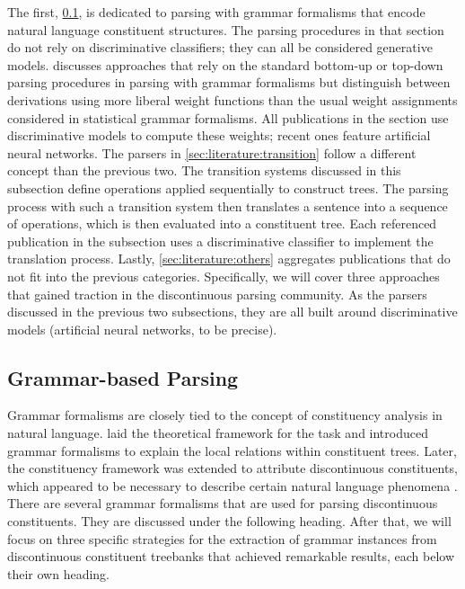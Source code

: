 \documentclass[../document.tex]{subfiles}
\begin{document}
    The first, \cref{sec:literature:grammar}, is dedicated to parsing with grammar formalisms that encode natural language constituent structures.
    The parsing procedures in that section do not rely on discriminative classifiers; they can all be considered generative models.
     discusses approaches that rely on the standard bottom-up or top-down parsing procedures in parsing with grammar formalisms but distinguish between derivations using more liberal weight functions than the usual weight assignments considered in statistical grammar formalisms.
    All publications in the section use discriminative models to compute these weights; recent ones feature artificial neural networks.
    The parsers in \cref{sec:literature:transition} follow a different concept than the previous two.
    The transition systems discussed in this subsection define operations applied sequentially to construct trees.
    The parsing process with such a transition system then translates a sentence into a sequence of operations, which is then evaluated into a constituent tree.
    Each referenced publication in the subsection uses a discriminative classifier to implement the translation process.
    Lastly, \cref{sec:literature:others} aggregates publications that do not fit into the previous categories.
    Specifically, we will cover three approaches that gained traction in the discontinuous parsing community.
    As the parsers discussed in the previous two subsections, they are all built around discriminative models (artificial neural networks, to be precise).

    \subsection{Grammar-based Parsing}\label{sec:literature:grammar}
    Grammar formalisms are closely tied to the concept of constituency analysis in natural language.
     laid the theoretical framework for the task and introduced grammar formalisms to explain the local relations within constituent trees.
    Later, the constituency framework was extended to attribute discontinuous constituents, which appeared to be necessary to describe certain natural language phenomena \citep{Shieber85}.
    There are several grammar formalisms that are used for parsing discontinuous constituents.
    They are discussed under the following heading.
    After that, we will focus on three specific strategies for the extraction of grammar instances from discontinuous constituent treebanks that achieved remarkable results, each below their own heading.
\end{document}
